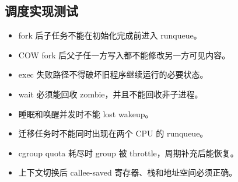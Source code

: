 \subsection{调度实现测试}

\begin{itemize}
\tightlist
\item fork 后子任务不能在初始化完成前进入 runqueue。
\item COW fork 后父子任一方写入都不能修改另一方可见内容。
\item exec 失败路径不得破坏旧程序继续运行的必要状态。
\item wait 必须能回收 zombie，并且不能回收非子进程。
\item 睡眠和唤醒并发时不能 lost wakeup。
\item 迁移任务时不能同时出现在两个 CPU 的 runqueue。
\item cgroup quota 耗尽时 group 被 throttle，周期补充后能恢复。
\item 上下文切换后 callee-saved 寄存器、栈和地址空间必须正确。
\end{itemize}
